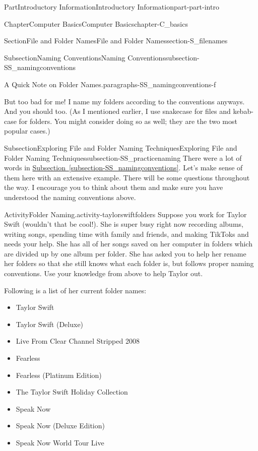 \documentclass[oneside,10pt,]{book}
\newcommand{\xreffont}{\relax}
\begin{document}
\begin{partptx}{Part}{Introductory Information}{}{Introductory Information}{}{}{part-part-intro}
\begin{chapterptx}{Chapter}{Computer Basics}{}{Computer Basics}{}{}{chapter-C_basics}
\begin{sectionptx}{Section}{File and Folder Names}{}{File and Folder Names}{}{}{section-S_filenames}
\begin{subsectionptx}{Subsection}{Naming Conventions}{}{Naming Conventions}{}{}{subsection-SS_namingconventions}
\begin{paragraphs}{A Quick Note on Folder Names.}{paragraphs-SS_namingconventions-f}
\par
But too bad for me! I name my folders according to the conventions anyways. And you should too. (As I mentioned earlier, I use snake\textunderscore{}case for files and kebab-case for folders. You might consider doing so as well; they are the two most popular cases.)%
\end{paragraphs}%
\end{subsectionptx}
%
%
\typeout{************************************************}
\typeout{************************************************}
%
\begin{subsectionptx}{Subsection}{Exploring File and Folder Naming Techniques}{}{Exploring File and Folder Naming Techniques}{}{}{subsection-SS_practicenaming}
There were a lot of words in \hyperref[subsection-SS_namingconventions]{Subsection~{\xreffont\ref{subsection-SS_namingconventions}}}. Let's make sense of them here with an extensive example. There will be some questions throughout the way. I encourage you to think about them and make sure you have understood the naming conventions above.%
\begin{activity}{Activity}{Folder Naming.}{activity-taylorswiftfolders}%
%
Suppose you work for Taylor Swift (wouldn't that be cool!). She is super busy right now recording albums, writing songs, spending time with family and friends, and making TikToks and needs your help. She has all of her songs saved on her computer in folders which are divided up by one album per folder. She has asked you to help her rename her folders so that she still knows what each folder is, but follows proper naming conventions. Use your knowledge from above to help Taylor out.%
\par
Following is a list of her current folder names:%
\begin{multicols}{2}
\begin{itemize}[label=\textbullet]
\item{}Taylor Swift%
\item{}Taylor Swift (Deluxe)%
\item{}Live From Clear Channel Stripped 2008%
\item{}Fearless%
\item{}Fearless (Platinum Edition)%
\item{}The Taylor Swift Holiday Collection%
\item{}Speak Now%
\item{}Speak Now (Deluxe Edition)%
\item{}Speak Now World Tour Live%

\end{itemize}
\end{multicols}
\end{activity}
\end{subsectionptx}
\end{sectionptx}
\end{chapterptx}
\end{partptx}
\end{document}
